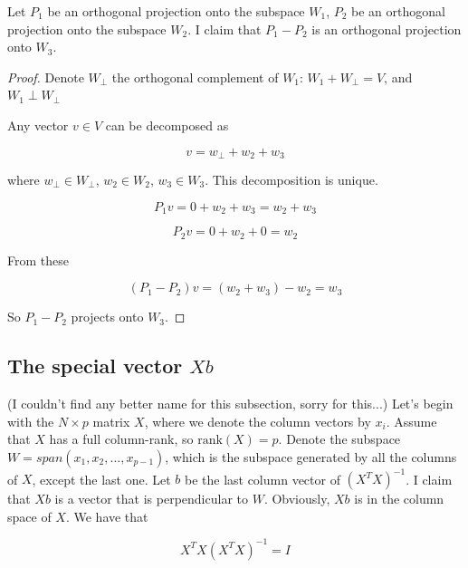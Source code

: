 \documentclass{article}
\begin{document}
\begin{appendices}
Let $P_1$ be an orthogonal projection onto the subspace $W_1$, $P_2$ be an orthogonal projection onto the subspace $W_2$. I claim that $P_1 - P_2$ is an orthogonal projection onto $W_3$.

\begin{proof}
Denote $W_{\perp}$ the orthogonal complement of $W_1$: $W_1 + W_{\perp} = V$, and $W_1 \perp W_{\perp}$

Any vector $v \in V$ can be decomposed as

\begin{equation}
    v = w_{\perp} + w_2 + w_3
\end{equation}

where $w_{\perp} \in W_{\perp}$, $w_2 \in W_2$, $w_3 \in W_3$. This decomposition is unique.

\begin{equation}
    P_1 v = 0 + w_2 + w_3 = w_2 + w_3
\end{equation}

\begin{equation}
    P_2 v = 0 + w_2 + 0 = w_2
\end{equation}

From these

\begin{equation}
    (P_1 - P_2) v = (w_2 + w_3) - w_2 = w_3
\end{equation}

So $P_1 - P_2$ projects onto $W_3$.

\end{proof}

\subsection{The special vector $Xb$} \label{app:spec_Xb}

(I couldn't find any better name for this subsection, sorry for this...) Let's begin with the $N\times p$ matrix $X$, where we denote the column vectors by $x_i$. Assume that $X$ has a full column-rank, so $\text{rank}(X)=p$. Denote the subspace $W = span(x_1, x_2, \dots, x_{p-1})$, which is the subspace generated by all the columns of $X$, except the last one. Let $b$ be the last column vector of $(X^TX)^{-1}$. I claim that $Xb$ is a vector that is perpendicular to $W$. Obviously, $Xb$ is in the column space of $X$. We have that

\begin{equation}
    X^TX(X^TX)^{-1} = I
\end{equation}


\end{appendices}
\end{document}
